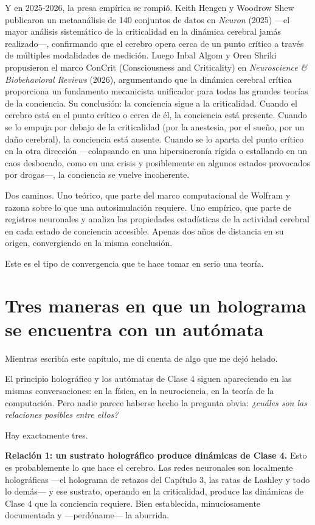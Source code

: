 \documentclass[11pt, twoside, openright]{book}
\begin{document}
Y en 2025-2026, la presa empírica se rompió. Keith Hengen y Woodrow Shew publicaron un metaanálisis de 140 conjuntos de datos en \textit{Neuron} (2025) ---el mayor análisis sistemático de la criticalidad en la dinámica cerebral jamás realizado---, confirmando que el cerebro opera cerca de un punto crítico a través de múltiples modalidades de medición. Luego Inbal Algom y Oren Shriki propusieron el marco ConCrit (Consciousness and Criticality) en \textit{Neuroscience \& Biobehavioral Reviews} (2026), argumentando que la dinámica cerebral crítica proporciona un fundamento mecanicista unificador para todas las grandes teorías de la conciencia. Su conclusión: la conciencia sigue a la criticalidad. Cuando el cerebro está en el punto crítico o cerca de él, la conciencia está presente. Cuando se lo empuja por debajo de la criticalidad (por la anestesia, por el sueño, por un daño cerebral), la conciencia está ausente. Cuando se lo aparta del punto crítico en la otra dirección ---colapsando en una hipersincronía rígida o estallando en un caos desbocado, como en una crisis y posiblemente en algunos estados provocados por drogas---, la conciencia se vuelve incoherente.

Dos caminos. Uno teórico, que parte del marco computacional de Wolfram y razona sobre lo que una autosimulación requiere. Uno empírico, que parte de registros neuronales y analiza las propiedades estadísticas de la actividad cerebral en cada estado de conciencia accesible. Apenas dos años de distancia en su origen, convergiendo en la misma conclusión.

Este es el tipo de convergencia que te hace tomar en serio una teoría.

\section*{Tres maneras en que un holograma se encuentra con un autómata}

Mientras escribía este capítulo, me di cuenta de algo que me dejó helado.

El principio holográfico y los autómatas de Clase 4 siguen apareciendo en las mismas conversaciones: en la física, en la neurociencia, en la teoría de la computación. Pero nadie parece haberse hecho la pregunta obvia: \textit{¿cuáles son las relaciones posibles entre ellos?}

Hay exactamente tres.

\textbf{Relación 1: un sustrato holográfico produce dinámicas de Clase 4.} Esto es probablemente lo que hace el cerebro. Las redes neuronales son localmente holográficas ---el holograma de retazos del Capítulo 3, las ratas de Lashley y todo lo demás--- y ese sustrato, operando en la criticalidad, produce las dinámicas de Clase 4 que la conciencia requiere. Bien establecida, minuciosamente documentada y ---perdóname--- la aburrida.
\end{document}
